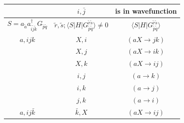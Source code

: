 \documentclass[./thesis.tex]{subfiles}
\begin{document}
\begin{table}
\begin{tabular}{ c|c|c }
		                                                                                                   & $i,\bar j$                                                                                   & is in wavefunction                                              \\ 
		\hline \hline
		$S = a_{\tilde a} a^\dagger_{\tilde i \tilde j \tilde k} G_{\tilde p \tilde q} $                   & $\tilde r, \tilde s ; \langle S|H|G_{\tilde p \tilde q}^{\tilde r \tilde s} \rangle \neq 0$  & $\langle S|H|G_{\tilde p \tilde q}^{\tilde r \tilde s} \rangle$ \\
		\hline \hline
		\rule{0pt}{3ex} $a,ijk$                                                                                            & $X,i$                                                                                        & $(aX\rightarrow jk)$                                            \\
		                                                                                                   & $X,j$                                                                                        & $(aX\rightarrow ik)$                                            \\
		                                                                                                   & $X,k$                                                                                        & $(aX\rightarrow ij)$                                            \\
		                                                                                                   & $i,j$                                                                                        & $(a\rightarrow k)$                                              \\
		                                                                                                   & $i,k$                                                                                        & $(a\rightarrow j)$                                              \\
		                                                                                                   & $j,k$                                                                                        & $(a\rightarrow i)$                                              \\
		\hline
		\rule{0pt}{3ex} $a,ij \bar k$                                                                                      & $\bar k,X$                                                                                   & $(aX\rightarrow ij)$                                            \\

\end{tabular}
\end{table}
\end{document}
